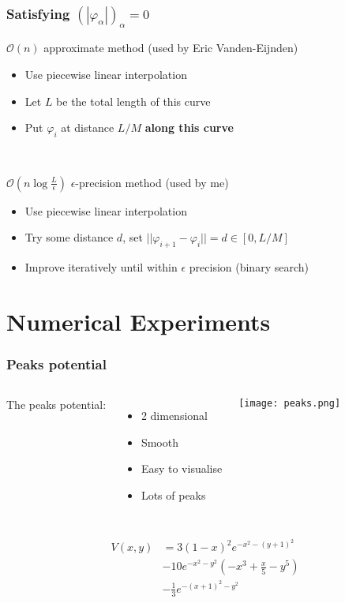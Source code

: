 \documentclass{beamer}
\renewcommand{\phi}{\varphi}
\renewcommand{\(}{\left(}
\renewcommand{\)}{\right)}
\begin{document}
\begin{frame}
\frametitle{Satisfying $(|\phi_\alpha|)_\alpha=0$}
\begin{block}{$\mathcal{O}(n)$ approximate method (used by Eric Vanden-Eijnden)}
\begin{itemize}
\item Use piecewise linear interpolation
\item Let $L$ be the total length of this curve
\item Put $\phi_i$ at distance $L/M$ \textbf{along this curve}
\end{itemize}
\end{block}
~\\
\begin{block}{$\mathcal{O}(n\log \frac{L}{\epsilon})$ $\epsilon$-precision method (used by me)}
\begin{itemize}
\item Use piecewise linear interpolation
\item Try some distance $d$, set $||\phi_{i+1}-\phi_i|| = d \in [0, L/M]$
\item Improve iteratively until within $\epsilon$ precision (binary search)
\end{itemize}
\end{block}
\end{frame}


\section{Numerical Experiments}
\begin{frame}
\frametitle{Peaks potential}
\vspace{-1em}
\begin{columns}[c]

The peaks potential:
\begin{itemize}
\item 2 dimensional
\item Smooth
\item Easy to visualise
\item Lots of peaks
\end{itemize}

\begin{center}
\texttt{[image: peaks.png]}
\end{center}
\end{columns}

\begin{align*}
V(x,y) & = 3 (1-x)^2 e^{-x^2-(y+1)^2}\\
&-10 e^{-x^2-y^2} \left(-x^3+\frac{x}{5}-y^5\right)\\
&-\frac{1}{3} e^{-(x+1)^2-y^2}\\
\end{align*}
\end{frame}
\end{document}
